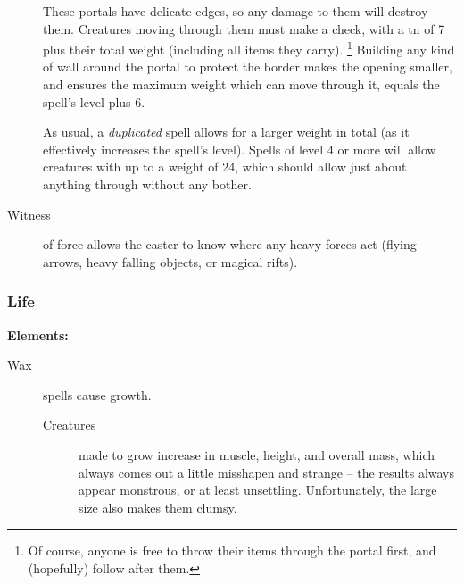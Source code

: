 \begin{multicols}{2}
\begin{description}
  These portals have delicate edges, so any damage to them will destroy them.
  Creatures moving through them must make a  check, with a \gls{tn} of 7 plus their total \gls{weight} (including all items they carry).%
  \footnote{Of course, anyone is free to throw their items through the portal first, and (hopefully) follow after them.}
  Building any kind of wall around the portal to protect the border makes the opening smaller, and ensures the maximum \gls{weight} which can move through it, equals the spell's level plus 6.

  As usual, a \textit{duplicated} spell allows for a larger \gls{weight} in total (as it effectively increases the spell's level).
  Spells of level 4 or more will allow creatures with up to a \gls{weight} of 24, which should allow just about anything through without any bother.
  \item[Witness]
  of force allows the caster to know where any heavy forces act (flying arrows, heavy falling objects, or magical rifts).
\end{description}

\subsubsection{Life}

\textbf{Elements:}

\begin{description}
  \item[Wax]
  spells cause growth.
    \begin{description}
      \item[Creatures]
        made to grow increase in muscle, height, and overall mass, which always comes out a little misshapen and strange -- the results always appear monstrous, or at least unsettling.
        Unfortunately, the large size also makes them clumsy.


\end{description}
\end{description}
\end{multicols}
